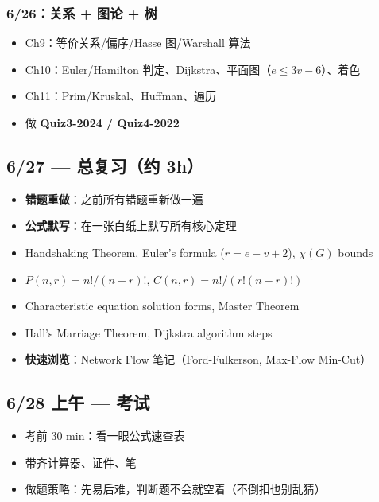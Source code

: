 \documentclass[10pt,a4paper,openany]{ctexbook}
\theoremstyle{definition}
\theoremstyle{remark}
\begin{document}
\subsubsection{6/26：关系 + 图论 + 树}

\begin{itemize}
\item [ ] Ch9：等价关系/偏序/Hasse 图/Warshall 算法
\item [ ] Ch10：Euler/Hamilton 判定、Dijkstra、平面图（$e \le 3v-6$）、着色
\item [ ] Ch11：Prim/Kruskal、Huffman、遍历
\item [ ] 做 \textbf{Quiz3-2024 / Quiz4-2022}

\end{itemize}

\vspace{-2pt}

\subsection{6/27 — 总复习（约 3h）}

\begin{itemize}
\item [ ] \textbf{错题重做}：之前所有错题重新做一遍
\item [ ] \textbf{公式默写}：在一张白纸上默写所有核心定理
\item Handshaking Theorem, Euler's formula ($r = e - v + 2$), $\chi(G)$ bounds
\item $P(n,r) = n!/(n-r)!$, $C(n,r) = n!/(r!(n-r)!)$
\item Characteristic equation solution forms, Master Theorem
\item Hall's Marriage Theorem, Dijkstra algorithm steps
\item [ ] \textbf{快速浏览}：Network Flow 笔记（Ford-Fulkerson, Max-Flow Min-Cut）

\end{itemize}

\vspace{-2pt}

\subsection{6/28 上午 — 考试}

\begin{itemize}
\item [ ] 考前 30 min：看一眼公式速查表
\item [ ] 带齐计算器、证件、笔
\item [ ] 做题策略：先易后难，判断题不会就空着（不倒扣也别乱猜）

\end{itemize}
\end{document}
